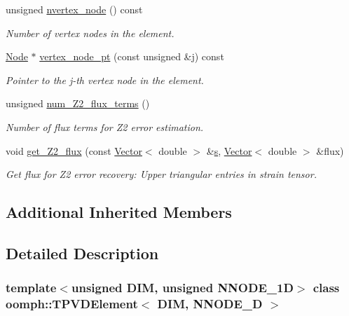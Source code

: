 \begin{DoxyCompactItemize}
unsigned \hyperlink{classoomph_1_1TPVDElement_aa23910847f4faa1d3701756c0f5a1e58}{nvertex\+\_\+node} () const
\begin{DoxyCompactList}\small\item\em Number of vertex nodes in the element. \end{DoxyCompactList}\item 
\hyperlink{classoomph_1_1Node}{Node} $\ast$ \hyperlink{classoomph_1_1TPVDElement_a3251ad69f6f52975c923120e06487217}{vertex\+\_\+node\+\_\+pt} (const unsigned \&j) const
\begin{DoxyCompactList}\small\item\em Pointer to the j-\/th vertex node in the element. \end{DoxyCompactList}\item 
unsigned \hyperlink{classoomph_1_1TPVDElement_a2cae6a6faf4fd3f7555f672fad077061}{num\+\_\+\+Z2\+\_\+flux\+\_\+terms} ()
\begin{DoxyCompactList}\small\item\em Number of \textquotesingle{}flux\textquotesingle{} terms for Z2 error estimation. \end{DoxyCompactList}\item 
void \hyperlink{classoomph_1_1TPVDElement_a156300359d98bc69d81773b3b609329f}{get\+\_\+\+Z2\+\_\+flux} (const \hyperlink{classoomph_1_1Vector}{Vector}$<$ double $>$ \&\hyperlink{cfortran_8h_ab7123126e4885ef647dd9c6e3807a21c}{s}, \hyperlink{classoomph_1_1Vector}{Vector}$<$ double $>$ \&flux)
\begin{DoxyCompactList}\small\item\em Get \textquotesingle{}flux\textquotesingle{} for Z2 error recovery\+: Upper triangular entries in strain tensor. \end{DoxyCompactList}\end{DoxyCompactItemize}
\subsection*{Additional Inherited Members}


\subsection{Detailed Description}
\subsubsection*{template$<$unsigned D\+IM, unsigned N\+N\+O\+D\+E\+\_\+1D$>$\newline
class oomph\+::\+T\+P\+V\+D\+Element$<$ D\+I\+M, N\+N\+O\+D\+E\+\_\+D $>$}

